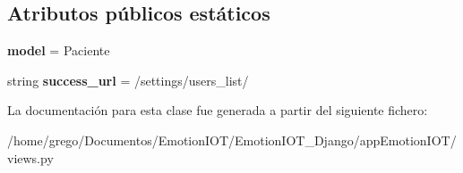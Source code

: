\subsection*{Atributos públicos estáticos}
\begin{DoxyCompactItemize}
\item 
{\bfseries model} = Paciente\hypertarget{classappEmotionIOT_1_1views_1_1User__delete_a73026320dbb0e3123e81d3445ae9fa70}{}\label{classappEmotionIOT_1_1views_1_1User__delete_a73026320dbb0e3123e81d3445ae9fa70}

\item 
string {\bfseries success\+\_\+url} = \textquotesingle{}/settings/users\+\_\+list/\textquotesingle{}\hypertarget{classappEmotionIOT_1_1views_1_1User__delete_adc42850829d773e0982af048d76adc86}{}\label{classappEmotionIOT_1_1views_1_1User__delete_adc42850829d773e0982af048d76adc86}

\end{DoxyCompactItemize}


La documentación para esta clase fue generada a partir del siguiente fichero\+:\begin{DoxyCompactItemize}
\item 
/home/grego/\+Documentos/\+Emotion\+I\+O\+T/\+Emotion\+I\+O\+T\+\_\+\+Django/app\+Emotion\+I\+O\+T/views.\+py\end{DoxyCompactItemize}
